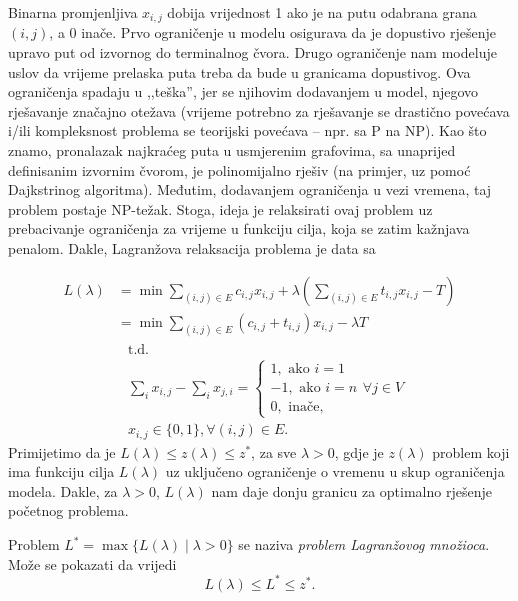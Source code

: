 \documentclass[b5paper, utf8, 11pt, colorlinks]{book}
\theoremstyle{definition}
\begin{document}
Binarna promjenljiva $x_{i,j}$ dobija vrijednost 1 ako je  na   putu odabrana grana $(i,j)$, a 0 inače. 
Prvo ograničenje u modelu osigurava da je dopustivo rješenje upravo put od izvornog do terminalnog čvora. Drugo ograničenje nam modeluje uslov da vrijeme prelaska puta treba da bude u  granicama dopustivog. Ova ograničenja spadaju u ,,teška'', jer se njihovim dodavanjem u model, njegovo rješavanje značajno otežava (vrijeme potrebno za rješavanje se drastično povećava i/ili  kompleksnost problema se teorijski povećava -- npr. sa P na NP). Kao što znamo,  pronalazak najkraćeg puta u usmjerenim grafovima, sa unaprijed definisanim izvornim čvorom, je polinomijalno rješiv (na primjer, uz pomoć Dajkstrinog algoritma). Međutim,  dodavanjem ograničenja u vezi vremena, taj problem postaje NP-težak. Stoga, ideja je  relaksirati ovaj problem uz prebacivanje ograničenja za vrijeme u funkciju cilja, koja se zatim kažnjava penalom. 
Dakle, Lagranžova relaksacija problema je data sa

\begin{align*}
       L(\lambda) &=\min\sum_{(i,j) \in E }c_{i,j}x_{i,j}  + \lambda(\sum_{(i,j) \in E} t_{i,j} x_{i,j} - T ) \\
       &= \min \sum_{(i,j) \in E} (c_{i,j} + t_{i,j} )x_{i,j} - \lambda T 
    \end{align*}
\begin{align*}
        &{\mbox{t.d.} }\\
    & \sum_{i} x_{i,j} - \sum_{i} x_{j,i} = \begin{cases}  
                                               1, \mbox{ ako } i=1 \\
                                              -1, \mbox{ ako } i=n \\
                                               0, \mbox{ inače},
                                            \end{cases} \forall j \in V\\
     & x_{i,j} \in \{0, 1 \}, \forall (i,j) \in E.
\end{align*}
Primijetimo da je $L(\lambda) \leq z(\lambda)  \leq z^*$, za sve $\lambda > 0$, gdje je $z(\lambda)$ problem koji ima funkciju cilja $L(\lambda)$ uz uključeno ograničenje o vremenu u skup ograničenja modela. Dakle, za $\lambda >0$, $L(\lambda)$ nam daje donju granicu za optimalno rješenje početnog problema. 

Problem $L^* = \max \{ L(\lambda) \mid \lambda > 0  \}$ se naziva \emph{problem Lagranžovog množioca}. Može se pokazati da vrijedi 
$$ L(\lambda) \leq L^* \leq z^*.$$
\end{document}
